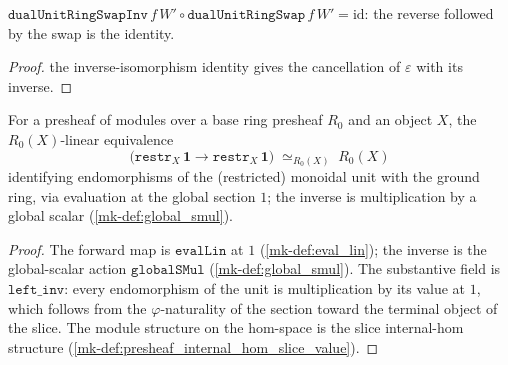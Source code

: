 \begin{lemma}\label{mk-lem:dual_unit_ring_swap_inv_comp}
  \leanok

  \(\mathtt{dualUnitRingSwapInv}\,f\,W' \circ \mathtt{dualUnitRingSwap}\,f\,W' =
  \mathrm{id}\): the reverse followed by the swap is the identity.
\end{lemma}
\begin{proof}
  \leanok
the inverse-isomorphism identity gives the cancellation of
  \(\varepsilon\) with its inverse.
\end{proof}

\begin{definition}\label{mk-def:unit_dual_section_equiv}
  \leanok

  For a presheaf of modules over a base ring presheaf \(R_0\) and an object \(X\), the
  \(R_0(X)\)-linear equivalence
  \[
    \bigl(\mathtt{restr}_X\,\mathbf 1 \to \mathtt{restr}_X\,\mathbf 1\bigr)
      \;\simeq_{R_0(X)}\; R_0(X)
  \]
  identifying endomorphisms of the (restricted) monoidal unit with the ground ring, via
  evaluation at the global section \(1\); the inverse is multiplication by a global scalar
  (\ref{mk-def:global_smul}).
\end{definition}
\begin{proof}
  \leanok
 The forward map is \(\mathtt{evalLin}\) at \(1\)
  (\ref{mk-def:eval_lin}); the inverse is the global-scalar action \(\mathtt{globalSMul}\)
  (\ref{mk-def:global_smul}). The substantive field is \(\mathtt{left\_inv}\): every
  endomorphism of the unit is multiplication by its value at \(1\), which follows from the
  \(\varphi\)-naturality of the section toward the terminal object of the slice. The module
  structure on the hom-space is the slice internal-hom structure
  (\ref{mk-def:presheaf_internal_hom_slice_value}).
\end{proof}

